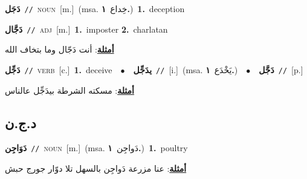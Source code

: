 \documentclass[10pt,a4paper,twoside]{article} %
\begin{document}
\begin{multicols}{2}
{{{{{{{{{{{\setlength\topsep{0pt}\textbf{\foreignlanguage{arabic}{دَجَل}}\ {\color{gray}\texttt{//}\color{black}}\ \textsc{noun}\ [m.]\ \color{gray}(msa. \foreignlanguage{arabic}{خِداع}~\foreignlanguage{arabic}{\textbf{١.}})\color{black}\ \textbf{1.}~deception\ 

{\setlength\topsep{0pt}\textbf{\foreignlanguage{arabic}{دَجَّال}}\ {\color{gray}\texttt{//}\color{black}}\ \textsc{adj}\ [m.]\ \textbf{1.}~imposter  \textbf{2.}~charlatan\  \begin{flushright}\color{gray}\foreignlanguage{arabic}{\textbf{\underline{\foreignlanguage{arabic}{أمثلة}}}: أنت دَجّال وما بتخاف الله}\end{flushright}\color{black}} \vspace{2mm}

{\setlength\topsep{0pt}\textbf{\foreignlanguage{arabic}{دَجِّل}}\ {\color{gray}\texttt{//}\color{black}}\ \textsc{verb}\ [c.]\ \textbf{1.}~deceive\ \ $\bullet$\ \ \setlength\topsep{0pt}\textbf{\foreignlanguage{arabic}{يدَجِّل}}\ {\color{gray}\texttt{//}\color{black}}\ [i.]\ \color{gray}(msa. \foreignlanguage{arabic}{يَخْدَع}~\foreignlanguage{arabic}{\textbf{١.}})\color{black}\ \ $\bullet$\ \ \setlength\topsep{0pt}\textbf{\foreignlanguage{arabic}{دَجَّل}}\ {\color{gray}\texttt{//}\color{black}}\ [p.]\  \begin{flushright}\color{gray}\foreignlanguage{arabic}{\textbf{\underline{\foreignlanguage{arabic}{أمثلة}}}: مسكته الشرطة بيدَجِّل عالناس}\end{flushright}\color{black}} \vspace{2mm}

\vspace{-3mm}
\subsection*{\color{blue}\foreignlanguage{arabic}{د.ج.ن}\color{blue}{}} 

{\setlength\topsep{0pt}\textbf{\foreignlanguage{arabic}{دَوَاجِن}}\ {\color{gray}\texttt{//}\color{black}}\ \textsc{noun}\ [m.]\ \color{gray}(msa. \foreignlanguage{arabic}{دَواجِن}~\foreignlanguage{arabic}{\textbf{١.}})\color{black}\ \textbf{1.}~poultry\  \begin{flushright}\color{gray}\foreignlanguage{arabic}{\textbf{\underline{\foreignlanguage{arabic}{أمثلة}}}: عنا مزرعة دَواجِن بالسهل تلا دوّار جورج حبش}\end{flushright}\color{black}} \vspace{2mm}

}}}}}}}}}}}
\end{multicols}
\end{document}
